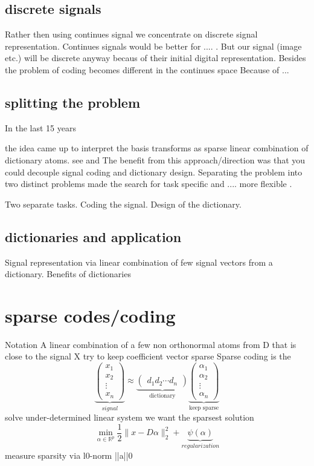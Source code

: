 \subsection{discrete signals}
Rather then using continues signal we concentrate on discrete signal representation.
Continues signals would be better for .... . But our signal (image etc.) will be discrete anyway becaus of their initial digital representation. 
Besides the problem of coding becomes different in the continues space \cite{} Because of ...

\subsection{splitting the problem}
In the last 15 years 

the idea came up to interpret the basis transforms as sparse linear combination of dictionary atoms.
see \cite{Olshausen Field 1997} and \cite{}
The benefit from this approach/direction was that you could decouple signal coding and dictionary design.
Separating the problem into two distinct problems made the search for task specific and .... more flexible \cite{?}.

Two separate tasks.
Coding the signal. Design of the dictionary.

\subsection{dictionaries and application}
Signal representation via linear combination of few signal vectors from a dictionary.
Benefits of dictionaries


\section{sparse codes/coding}
Notation
A linear combination of a few non orthonormal atoms from
D that is close to the signal X
try to keep coefficient vector sparse
Sparse coding is the 
\[
\underbrace{\begin{pmatrix} x_1 \\ x_2 \\ \vdots \\ x_n \end{pmatrix}}_{signal} \approx \underbrace{\begin{pmatrix} d_1  d_2 \cdots d_n \end{pmatrix}}_{\textrm{dictionary}}
\underbrace{\begin{pmatrix} \alpha_1 \\ \alpha_2 \\ \vdots \\ \alpha_n \end{pmatrix}}_{\textrm{keep sparse}}
\]
solve under-determined linear system
we want the sparsest solution
\[
\min_{\alpha\in\mathbb{R}^{p}} \frac{1}{2} \lVert x - D\alpha \rVert^{2}_{2} + \underbrace{\psi(\alpha)}_{regularization}
\] 
measure sparsity via       l0-norm       ||a||0

